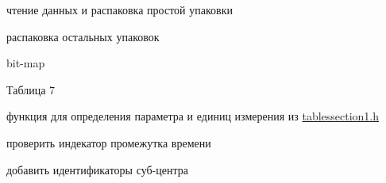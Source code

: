 
\begin{DoxyRefList}
\item[Класс \mbox{\hyperlink{class_b_d_s}{B\+DS}} ]\label{todo__todo000001}%
%
чтение данных и распаковка простой упаковки 

распаковка остальных упаковок  
\item[Класс \mbox{\hyperlink{class_b_m_s}{B\+MS}} ]\label{todo__todo000002}%
%
bit-\/map  
\item[Класс \mbox{\hyperlink{class_g_d_s}{G\+DS}} ]\label{todo__todo000003}%
%
Таблица 7  
\item[Класс \mbox{\hyperlink{class_p_d_s}{P\+DS}} ]\label{todo__todo000004}%
%
функция для определения параметра и единиц измерения из \mbox{\hyperlink{tablessection1_8h_source}{tablessection1.\+h}} 

проверить индекатор промежутка времени 

добавить идентификаторы суб-\/центра 
\end{DoxyRefList}